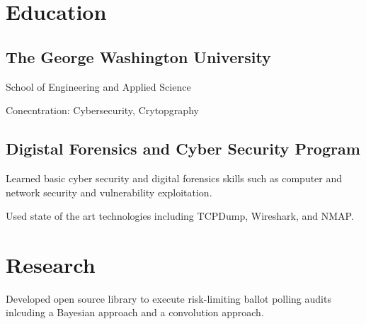 \documentclass[]{deedy-resume-openfont}
\begin{document}
\begin{minipage}[t]{0.66\textwidth}



        \section{Education}
        \subsection{The George Washington University}
        School of Engineering and Applied Science\\
        \vspace{\topsep}
        \begin{tightemize}
        \item Conecntration: Cybersecurity, Crytopgraphy
        \end{tightemize}
        \sectionsep

        \subsection{Digistal Forensics and Cyber Security Program}
        \vspace{\topsep}
        \begin{tightemize}
        \item Learned basic cyber security and digital forensics skills such as computer and network security and vulnerability exploitation.
        \item Used state of the art technologies including TCPDump, Wireshark, and NMAP.
        \end{tightemize}



        \section{Research}
        Developed open source library to execute risk-limiting ballot polling audits inlcuding a Bayesian approach and a convolution approach.
        

\end{minipage}
\end{document}
